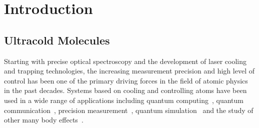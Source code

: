 
\chapter{Introduction}
\label{ch:introduction}

\section{Ultracold Molecules}
\label{ch:introduction:molecules}

Starting with precise optical spectroscopy and the development of laser cooling
and trapping technologies, the increasing measurement precision and
high level of control has been one of the primary driving forces
in the field of atomic physics in the past decades.
Systems based on cooling and controlling atoms
have been used in a wide range of applications including
quantum computing~\cite{wang_single-qubit_2016,anderlini_controlled_2007,
  kaufman_entangling_2015,levine_high-fidelity_2018,isenhower_demonstration_2010},
quantum communication~\cite{tiecke_nanophotonic_2014,reiserer_quantum_2014,
  welte_photon-mediated_2018},
precision measurement~\cite{bloom_optical_2014,parker_measurement_2018},
quantum simulation~\cite{bakr_quantum_2009,cheuk_quantum-gas_2015,bernien_probing_2017,
  leseleuc_observation_2019,koepsell_imaging_2019,chiu_string_2019,
  bloch_many-body_2008,lahaye_physics_2009}
and the study of other many body effects~\cite{weiner_experiments_1999,
  sompet_thermally_2019,xu_interaction-induced_2015,guan_density_2019,
  dimitrova_observation_2017}.

